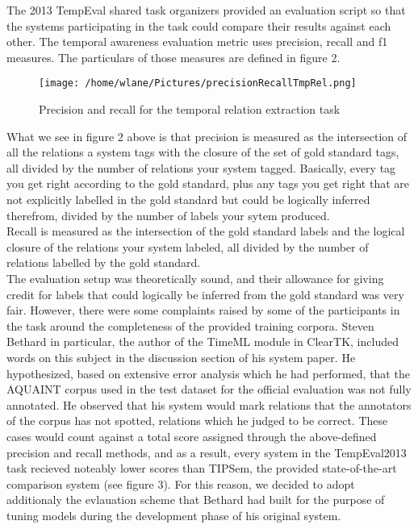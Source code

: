 \documentclass[11pt]{article}
\begin{document}
	The 2013 TempEval shared task organizers provided an evaluation script so that the systems participating in the task could compare their results against each other. The temporal awareness evaluation metric uses precision, recall and f1 measures. The particulars of those measures are defined in figure 2.
\begin{figure}[H]
\centering
\texttt{[image: /home/wlane/Pictures/precisionRecallTmpRel.png]}
\caption{Precision and recall for the temporal relation extraction task}\label{precision and recall}
\end{figure}
\indent What we see in figure 2 above is that precision is measured as the intersection of all the relations a system tags with the closure of the set of gold standard tags, all divided by the number of relations your system tagged. Basically, every tag you get right according to the gold standard, plus any tags you get right that are not explicitly labelled in the gold standard but could be logically inferred therefrom, divided by the number of labels your sytem produced.\\\indent
Recall is measured as the intersection of the gold standard labels and the logical closure  of the relations your system labeled, all divided by the number of relations labelled by the gold standard.\\\indent
The evaluation setup was theoretically sound, and their allowance for giving credit for labels that could logically be inferred from the gold standard was very fair. However, there were some complaints raised by some of the participants in the task around the completeness of the provided training corpora. Steven Bethard in particular, the author of the TimeML module in ClearTK, included words on this subject in the discussion section of his system paper. He hypothesized, based on extensive error analysis which he had performed, that the AQUAINT corpus used in the test dataset for the official evaluation was not fully annotated. He observed that his system would mark relations that the annotators of the corpus has not spotted, relations which he judged to be correct. These cases would count against a total score assigned through the above-defined precision and recall methods, and as a result, every system in the TempEval2013 task recieved noteably lower scores than TIPSem, the provided state-of-the-art comparison system (see figure 3). For this reason, we decided to adopt additionaly the evlauation scheme that Bethard had built for the purpose of tuning models during the development phase of his original system.
\end{document}
